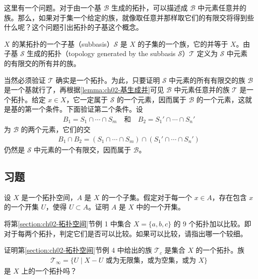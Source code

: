 \documentclass[../../main.tex]{subfiles}
\begin{document}
这里有一个问题。对于由一个基 $\mathcal{B}$ 生成的拓扑，可以描述成 $\mathcal{B}$ 中元素任意并的族。那么，如果对于集一个给定的族，就像取任意并那样取它们的有限交将得到些什么呢？这个问题引出拓扑的子基这个概念。

\begin{definition}[子基与由子基生成的拓扑]\label{definition:ch02-子基}
$X$ 的某拓扑的一个子基（subbasis）$\mathcal{S}$ 是 $X$ 的子集的一个族，它的并等于 $X$。由子基 $\mathcal{S}$ 生成的拓扑（topology generated by the subbasis $\mathcal{S}$）$\mathcal{T}$ 定义为 $\mathcal{S}$ 中元素的有限交的所有并的族。
\end{definition}

当然必须验证 $\mathcal{T}$ 确实是一个拓扑。为此，只要证明 $\mathcal{S}$ 中元素的所有有限交的族 $\mathcal{B}$ 是一个基就行了，再根据\cref{lemma:ch02-基生成并}可见 $\mathcal{B}$ 中元素任意并的族 $\mathcal{T}$ 是一个拓扑。给定 $x \in X$，它一定属于 $\mathcal{S}$ 的一个元素，因而属于 $\mathcal{B}$ 的一个元素，这就是基的第一个条件。下面验证第二个条件。设
\begin{align*}
B_{1} = S_{1} \cap \cdots \cap S_{m} \quad \text{和} \quad B_{2} = S_{1}' \cap \cdots \cap S_{n}'
\end{align*}
为 $\mathcal{B}$ 的两个元素，它们的交
\begin{align*}
B_{1} \cap B_{2} = (S_{1} \cap \cdots \cap S_{m}) \cap (S_{1}' \cap \cdots \cap S_{n}')
\end{align*}
仍然是 $\mathcal{S}$ 中元素的一个有限交，因而属于 $\mathcal{B}$。

\subsection*{习题}

\begin{exercise}\label{exercise:ch02-拓扑的基-1}
设 $X$ 是一个拓扑空间，$A$ 是 $X$ 的一个子集。假定对于每一个 $x \in A$，存在包含 $x$ 的一个开集 $U$，使得 $U \subset A$。证明 $A$ 是 $X$ 中的一个开集。
\end{exercise}

\begin{exercise}\label{exercise:ch02-拓扑的基-2}
将第\cref{section:ch02-拓扑空间}节例 1 中集合 $X = \{a, b, c\}$ 的 9 个拓扑加以比较。即对于每两个拓扑，判定它们是否可以比较。如果可以比较，请指出哪一个较细。
\end{exercise}

\begin{exercise}\label{exercise:ch02-拓扑的基-3}
证明第\cref{section:ch02-拓扑空间}节例 4 中给出的族 $\mathcal{T}_{c}$ 是集合 $X$ 的一个拓扑。族
\begin{align*}
\mathcal{T}_{\infty} = \{U \mid X - U \text{ 或为无限集，或为空集，或为 } X\}
\end{align*}
是 $X$ 上的一个拓扑吗？
\end{exercise}
\end{document}
